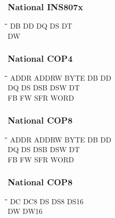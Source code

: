 \subsubsection{National INS807x}
{\tt\begin{tabbing}
\hspace{3cm}\=\hspace{3cm}\=\hspace{3cm}\=\hspace{3cm}\=\kill
DB         \> DD          \> DQ          \> DS          \> DT \\
DW \\
\end{tabbing}}
        
\subsubsection{National COP4}
{\tt\begin{tabbing}
\hspace{3cm}\=\hspace{3cm}\=\hspace{3cm}\=\hspace{3cm}\=\kill
ADDR       \> ADDRW       \> BYTE        \> DB          \> DD \\
DQ         \> DS          \> DSB         \> DSW         \> DT \\
FB         \> FW          \> SFR         \> WORD \\
\end{tabbing}}

\subsubsection{National COP8}
{\tt\begin{tabbing}
\hspace{3cm}\=\hspace{3cm}\=\hspace{3cm}\=\hspace{3cm}\=\kill
ADDR       \> ADDRW       \> BYTE        \> DB          \> DD \\
DQ         \> DS          \> DSB         \> DSW         \> DT \\
FB         \> FW          \> SFR         \> WORD \\
\end{tabbing}}

\subsubsection{National COP8}
{\tt\begin{tabbing}
\hspace{3cm}\=\hspace{3cm}\=\hspace{3cm}\=\hspace{3cm}\=\kill
DC         \> DC8         \> DS          \> DS8         \> DS16 \\
DW         \> DW16 \\
\end{tabbing}}


